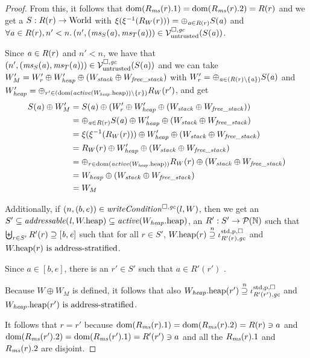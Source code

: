 \documentclass[a4paper]{article}
\begin{document}
\begin{proof}
  From this, it follows that $\dom(R_\ms(r).1) = \dom(R_\ms(r).2) = R(r)$ and we get a $S : R(r) \fun \World$ with $\xi(\xi^{-1}(R_W(r))) = \oplus_{\aaddr \in R(r)} S(\aaddr)$ and $\forall \aaddr \in R(r),n' < n \ldotp \npair[n']{(\ms_S(\aaddr),\ms_T(\aaddr))} \in \lrv(S(\aaddr))$.

  Since $\aaddr \in R(r)$ and $n' < n$, we have that $\npair[n']{(\ms_S(\aaddr),\ms_T(\aaddr))} \in \lrv(S(\aaddr))$ and
  we can take $W_M' = W_r' \oplus W_{\var{heap}}' \oplus (W_{\var{stack}} \oplus W_{\var{free\_stack}})$ with $W_r' = \oplus_{\aaddr \in (R(r)\setminus \{\aaddr\})} S(\aaddr)$ and $W_\var{heap}' = \oplus_{r' \in (\dom(\activeReg{\pwheap[W_\var{heap}]})\setminus \{r\})} R_W(r')$, and get
  \begin{align*}
    S(\aaddr) \oplus W_M'
    &=S(\aaddr) \oplus (W_r' \oplus W_\var{heap}'\oplus (W_{\var{stack}} \oplus W_{\var{free\_stack}}))\\
    &=
    \oplus_{\aaddr \in R(r)} S(\aaddr) \oplus W_{\var{heap}}'\oplus (W_{\var{stack}} \oplus W_{\var{free\_stack}})\\
    &=
    \xi(\xi^{-1}(R_W(r))) \oplus W_\var{heap}'\oplus (W_{\var{stack}} \oplus W_{\var{free\_stack}})\\
    &=
    R_W(r) \oplus W_\var{heap}'\oplus (W_{\var{stack}} \oplus W_{\var{free\_stack}})\\
    &=
    \oplus_{r \in \dom(\activeReg{\pwheap[W_\var{heap}]})} R_W(r)\oplus (W_{\var{stack}} \oplus W_{\var{free\_stack}})\\
    &=
      W_\var{heap} \oplus (W_{\var{stack}} \oplus W_{\var{free\_stack}})\\
      &= W_M
  \end{align*}

  Additionally, if $\npair{(b,e)}\in\writeCond{l,W}$, then
  we get an $S'\subseteq \addressable{\lin, \pwheap} \subseteq \activeReg{\pwheap[W_\var{heap}]}$, an $R' : S' \fun \powerset{\nats}$ such that $\biguplus_{r \in S'} R'(r) \supseteq [\baddr,\eaddr]$ such that
  for all $r \in S'$, $\pwheap(r) \nsupeq \stdreg{R'(r),\gc}{\pur}$ and
  $\pwheap(r) \text{ is address-stratified}$.

  Since $a \in [b,e]$, there is an $r' \in S'$ such that $a \in R'(r')$ .
  
  Because $W \oplus W_M$ is defined, it follows that also 
  $\pwheap[W_\var{heap}](r') \nsupeq \stdreg{R'(r'),\gc}{\pur}$ and
  $\pwheap[W_\var{heap}](r') \text{ is address-stratified}$.

  It follows that $r = r'$ because $\dom(R_\ms(r).1) = \dom(R_\ms(r).2) = R(r) \ni a$ and $\dom(R_\ms(r').2) = \dom(R_\ms(r').1) = R'(r') \ni a$ and all the $R_\ms(r).1$ and $R_\ms(r).2$ are disjoint.


\end{proof}
\end{document}
